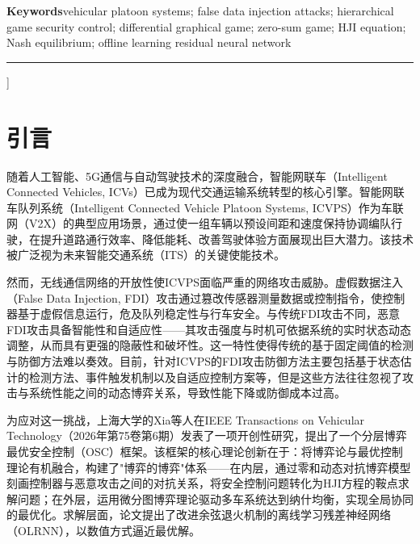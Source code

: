 \documentclass[10.5pt,a4paper,twoside,twocolumn]{ctexart}
\begin{document}
\vspace{3mm}
\noindent\textbf{Keywords}\quad vehicular platoon systems; false data injection attacks; hierarchical game security control; differential graphical game; zero-sum game; HJI equation; Nash equilibrium; offline learning residual neural network

\vspace{5mm}
\noindent\rule{\textwidth}{0.4pt}
\vspace{5mm}
]

\section{\heiti{} 引言}

随着人工智能、5G通信与自动驾驶技术的深度融合，智能网联车（Intelligent Connected Vehicles, ICVs）已成为现代交通运输系统转型的核心引擎。智能网联车队列系统（Intelligent Connected Vehicle Platoon Systems, ICVPS）作为车联网（V2X）的典型应用场景，通过使一组车辆以预设间距和速度保持协调编队行驶，在提升道路通行效率、降低能耗、改善驾驶体验方面展现出巨大潜力。该技术被广泛视为未来智能交通系统（ITS）的关键使能技术\cite{jia2016}。

然而，无线通信网络的开放性使ICVPS面临严重的网络攻击威胁。虚假数据注入（False Data Injection, FDI）攻击通过篡改传感器测量数据或控制指令，使控制器基于虚假信息运行，危及队列稳定性与行车安全。与传统FDI攻击不同，恶意FDI攻击具备智能性和自适应性——其攻击强度与时机可依据系统的实时状态动态调整，从而具有更强的隐蔽性和破坏性\cite{petit2015,geng2025}。这一特性使得传统的基于固定阈值的检测与防御方法难以奏效。目前，针对ICVPS的FDI攻击防御方法主要包括基于状态估计的检测方法\cite{sargolzaei2021}、事件触发机制\cite{yang2022}以及自适应控制方案\cite{ren2020}等，但是这些方法往往忽视了攻击与系统性能之间的动态博弈关系，导致性能下降或防御成本过高。

为应对这一挑战，上海大学的Xia等人在IEEE Transactions on Vehicular Technology（2026年第75卷第6期）发表了一项开创性研究\cite{xia2026}，提出了一个分层博弈最优安全控制（OSC）框架。该框架的核心理论创新在于：将博弈论与最优控制理论有机融合，构建了"博弈的博弈"体系——在内层，通过零和动态对抗博弈模型刻画控制器与恶意攻击之间的对抗关系，将安全控制问题转化为HJI方程的鞍点求解问题；在外层，运用微分图博弈理论驱动多车系统达到纳什均衡，实现全局协同的最优化。求解层面，论文提出了改进余弦退火机制的离线学习残差神经网络（OLRNN），以数值方式逼近最优解。
\end{document}

